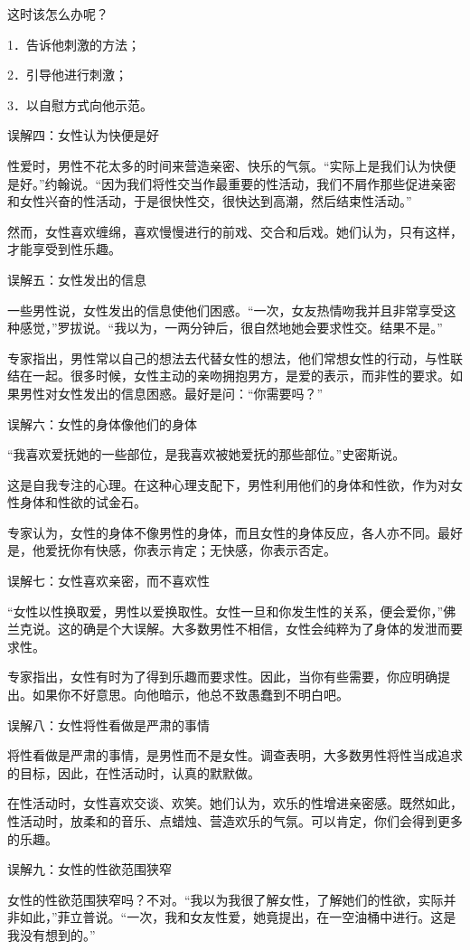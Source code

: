 \documentclass[12pt,UTF8]{ctexbook}
\begin{document}
这时该怎么办呢？

1．告诉他刺激的方法；

2．引导他进行刺激；

3．以自慰方式向他示范。

误解四：女性认为快便是好

性爱时，男性不花太多的时间来营造亲密、快乐的气氛。“实际上是我们认为快便是好。”约翰说。“因为我们将性交当作最重要的性活动，我们不屑作那些促进亲密和女性兴奋的性活动，于是很快性交，很快达到高潮，然后结束性活动。”

然而，女性喜欢缠绵，喜欢慢慢进行的前戏、交合和后戏。她们认为，只有这样，才能享受到性乐趣。

误解五：女性发出的信息

一些男性说，女性发出的信息使他们困惑。“一次，女友热情吻我并且非常享受这种感觉，”罗拔说。“我以为，一两分钟后，很自然地她会要求性交。结果不是。”

专家指出，男性常以自己的想法去代替女性的想法，他们常想女性的行动，与性联结在一起。很多时候，女性主动的亲吻拥抱男方，是爱的表示，而非性的要求。如果男性对女性发出的信息困惑。最好是问：“你需要吗？”

误解六：女性的身体像他们的身体

“我喜欢爱抚她的一些部位，是我喜欢被她爱抚的那些部位。”史密斯说。

这是自我专注的心理。在这种心理支配下，男性利用他们的身体和性欲，作为对女性身体和性欲的试金石。

专家认为，女性的身体不像男性的身体，而且女性的身体反应，各人亦不同。最好是，他爱抚你有快感，你表示肯定；无快感，你表示否定。

误解七：女性喜欢亲密，而不喜欢性

“女性以性换取爱，男性以爱换取性。女性一旦和你发生性的关系，便会爱你，”佛兰克说。这的确是个大误解。大多数男性不相信，女性会纯粹为了身体的发泄而要求性。

专家指出，女性有时为了得到乐趣而要求性。因此，当你有些需要，你应明确提出。如果你不好意思。向他暗示，他总不致愚蠢到不明白吧。

误解八：女性将性看做是严肃的事情

将性看做是严肃的事情，是男性而不是女性。调查表明，大多数男性将性当成追求的目标，因此，在性活动时，认真的默默做。

在性活动时，女性喜欢交谈、欢笑。她们认为，欢乐的性增进亲密感。既然如此，性活动时，放柔和的音乐、点蜡烛、营造欢乐的气氛。可以肯定，你们会得到更多的乐趣。

误解九：女性的性欲范围狭窄

女性的性欲范围狭窄吗？不对。“我以为我很了解女性，了解她们的性欲，实际并非如此，”菲立普说。“一次，我和女友性爱，她竟提出，在一空油桶中进行。这是我没有想到的。”
\end{document}

